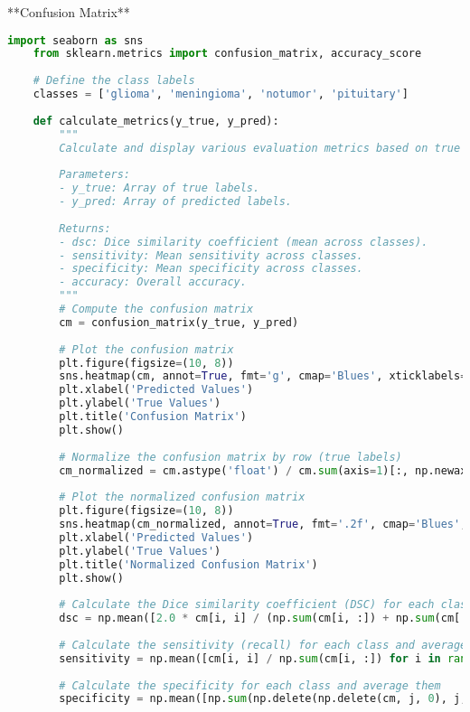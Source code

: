 **Confusion Matrix**
\begin{lstlisting}[language=Python]
    import seaborn as sns
    from sklearn.metrics import confusion_matrix, accuracy_score
    
    # Define the class labels
    classes = ['glioma', 'meningioma', 'notumor', 'pituitary']
    
    def calculate_metrics(y_true, y_pred):
        """
        Calculate and display various evaluation metrics based on true and predicted labels.
    
        Parameters:
        - y_true: Array of true labels.
        - y_pred: Array of predicted labels.
    
        Returns:
        - dsc: Dice similarity coefficient (mean across classes).
        - sensitivity: Mean sensitivity across classes.
        - specificity: Mean specificity across classes.
        - accuracy: Overall accuracy.
        """
        # Compute the confusion matrix
        cm = confusion_matrix(y_true, y_pred)
    
        # Plot the confusion matrix
        plt.figure(figsize=(10, 8))
        sns.heatmap(cm, annot=True, fmt='g', cmap='Blues', xticklabels=classes, yticklabels=classes)
        plt.xlabel('Predicted Values')
        plt.ylabel('True Values')
        plt.title('Confusion Matrix')
        plt.show()
    
        # Normalize the confusion matrix by row (true labels)
        cm_normalized = cm.astype('float') / cm.sum(axis=1)[:, np.newaxis]
    
        # Plot the normalized confusion matrix
        plt.figure(figsize=(10, 8))
        sns.heatmap(cm_normalized, annot=True, fmt='.2f', cmap='Blues', xticklabels=classes, yticklabels=classes)
        plt.xlabel('Predicted Values')
        plt.ylabel('True Values')
        plt.title('Normalized Confusion Matrix')
        plt.show()
    
        # Calculate the Dice similarity coefficient (DSC) for each class and average them
        dsc = np.mean([2.0 * cm[i, i] / (np.sum(cm[i, :]) + np.sum(cm[:, i])) for i in range(cm.shape[0])])
    
        # Calculate the sensitivity (recall) for each class and average them
        sensitivity = np.mean([cm[i, i] / np.sum(cm[i, :]) for i in range(cm.shape[0])])
    
        # Calculate the specificity for each class and average them
        specificity = np.mean([np.sum(np.delete(np.delete(cm, j, 0), j, 1)) / np.sum(np.delete(cm, j, 0)) for j in range(cm.shape[0])])
    

\end{lstlisting}
